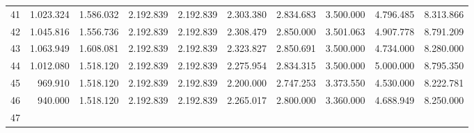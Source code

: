 \begin{tabular}{llllllllll}
\multicolumn{1}{l}{\hspace{1em}41} &
  \multicolumn{1}{|r}{1.023.324} &
  \multicolumn{1}{r}{1.586.032} &
  \multicolumn{1}{r}{2.192.839} &
  \multicolumn{1}{r}{2.192.839} &
  \multicolumn{1}{r}{2.303.380} &
  \multicolumn{1}{r}{2.834.683} &
  \multicolumn{1}{r}{3.500.000} &
  \multicolumn{1}{r}{4.796.485} &
  \multicolumn{1}{r}{8.313.866} \\
\multicolumn{1}{l}{\hspace{1em}42} &
  \multicolumn{1}{|r}{1.045.816} &
  \multicolumn{1}{r}{1.556.736} &
  \multicolumn{1}{r}{2.192.839} &
  \multicolumn{1}{r}{2.192.839} &
  \multicolumn{1}{r}{2.308.479} &
  \multicolumn{1}{r}{2.850.000} &
  \multicolumn{1}{r}{3.501.063} &
  \multicolumn{1}{r}{4.907.778} &
  \multicolumn{1}{r}{8.791.209} \\
\multicolumn{1}{l}{\hspace{1em}43} &
  \multicolumn{1}{|r}{1.063.949} &
  \multicolumn{1}{r}{1.608.081} &
  \multicolumn{1}{r}{2.192.839} &
  \multicolumn{1}{r}{2.192.839} &
  \multicolumn{1}{r}{2.323.827} &
  \multicolumn{1}{r}{2.850.691} &
  \multicolumn{1}{r}{3.500.000} &
  \multicolumn{1}{r}{4.734.000} &
  \multicolumn{1}{r}{8.280.000} \\
\multicolumn{1}{l}{\hspace{1em}44} &
  \multicolumn{1}{|r}{1.012.080} &
  \multicolumn{1}{r}{1.518.120} &
  \multicolumn{1}{r}{2.192.839} &
  \multicolumn{1}{r}{2.192.839} &
  \multicolumn{1}{r}{2.275.954} &
  \multicolumn{1}{r}{2.834.315} &
  \multicolumn{1}{r}{3.500.000} &
  \multicolumn{1}{r}{5.000.000} &
  \multicolumn{1}{r}{8.795.350} \\
\multicolumn{1}{l}{\hspace{1em}45} &
  \multicolumn{1}{|r}{969.910} &
  \multicolumn{1}{r}{1.518.120} &
  \multicolumn{1}{r}{2.192.839} &
  \multicolumn{1}{r}{2.192.839} &
  \multicolumn{1}{r}{2.200.000} &
  \multicolumn{1}{r}{2.747.253} &
  \multicolumn{1}{r}{3.373.550} &
  \multicolumn{1}{r}{4.530.000} &
  \multicolumn{1}{r}{8.222.781} \\
\multicolumn{1}{l}{\hspace{1em}46} &
  \multicolumn{1}{|r}{940.000} &
  \multicolumn{1}{r}{1.518.120} &
  \multicolumn{1}{r}{2.192.839} &
  \multicolumn{1}{r}{2.192.839} &
  \multicolumn{1}{r}{2.265.017} &
  \multicolumn{1}{r}{2.800.000} &
  \multicolumn{1}{r}{3.360.000} &
  \multicolumn{1}{r}{4.688.949} &
  \multicolumn{1}{r}{8.250.000} \\
\multicolumn{1}{l}{\hspace{1em}47} &

\end{tabular}
